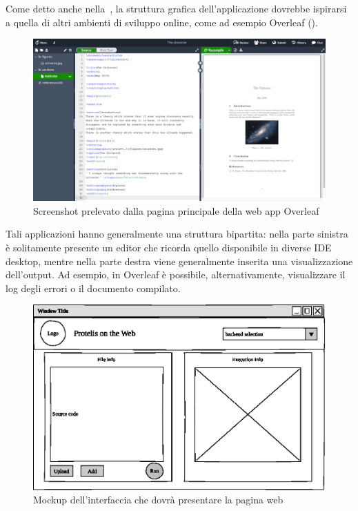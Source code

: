       Come detto anche nella~, la struttura grafica dell'applicazione dovrebbe ispirarsi a quella di altri ambienti di sviluppo online,
      come ad esempio Overleaf ().

      \begin{figure}[htbp]
        \centering
        \includegraphics[width=.85\textwidth]{res/fig/overleaf.png}%
        \caption{Screenshot prelevato dalla pagina principale della web app Overleaf}%
        \label{fig:overleaf}
      \end{figure}

      Tali applicazioni hanno generalmente una struttura bipartita:
      nella parte sinistra è solitamente presente un editor che ricorda quello disponibile in diverse IDE desktop, mentre nella parte destra viene generalmente inserita una visualizzazione dell'output.
      Ad esempio, in Overleaf è possibile, alternativamente, visualizzare il log degli errori o il documento compilato.

      \begin{figure}[htbp]
        \centering
        \includegraphics[width=.85\textwidth]{res/mockup/gui-actual.eps}%
        \caption{Mockup dell'interfaccia che dovrà presentare la pagina web}%
        \label{fig:mockup}
      \end{figure}

